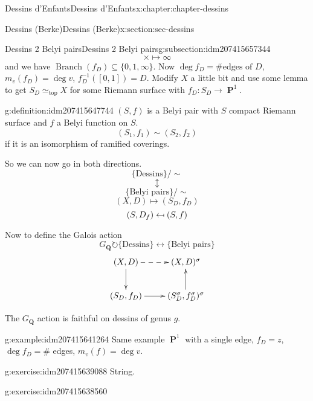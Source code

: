 \documentclass[oneside,10pt,]{book}
\numberwithin{equation}{section}
\newcommand{\lb}{[}
\newcommand{\rb}{]}
\providecommand\mapsfrom{\mathrel{\reflectbox{\ensuremath{\mapsto}}}}
\newcommand{\QQ}{\mathbf{Q}}
\newcommand{\acts}{\circlearrowright}
\DeclareMathOperator{\PP}{\mathbf{P}}
\begin{document}
\begin{chapterptx}{Dessins d'Enfants}{}{Dessins d'Enfants}{}{}{x:chapter:chapter-dessins}
\begin{sectionptx}{Dessins (Berke)}{}{Dessins (Berke)}{}{}{x:section:sec-dessins}
\begin{subsectionptx}{Dessins 2 Belyi pairs}{}{Dessins 2 Belyi pairs}{}{}{g:subsection:idm207415657344}
\begin{equation*}
\times \mapsto\infty
\end{equation*}
and we have \(\operatorname{Branch}(f_D) \subseteq \{0,1,\infty\}\). Now \(\deg f_D = \#\text{edges of }D\), \(m_v(f_D) = \deg v\), \(f_D^{-1}(\lb 0 , 1 \rb) = D\). Modify \(X\) a little bit and use some lemma to get \(S_D \simeq_{\text{top}} X\) for some Riemann surface with \(f_D\colon S_D \to \PP^1\).%
\begin{definition}{}{g:definition:idm207415647744}%
\((S,f)\) is a Belyi pair with \(S\) compact Riemann surface and  \(f\) a Belyi function on \(S\).%
\begin{equation*}
(S_1,f_1) \sim (S_2, f_2)
\end{equation*}
if it is an isomorphism of ramified coverings.%
\end{definition}
So we can now go in both directions.%
\begin{equation*}
\{\text{Dessins}\}/\sim
\end{equation*}
%
\begin{equation*}
\updownarrow
\end{equation*}
%
\begin{equation*}
\{\text{Belyi pairs}\}/\sim
\end{equation*}
%
\begin{equation*}
(X,D) \mapsto (S_D, f_D)
\end{equation*}
%
\begin{equation*}
(S, D_f) \mapsfrom (S,f)
\end{equation*}
%
\par
Now to define the Galois action%
\begin{equation*}
G_\QQ\acts \{\text{Dessins}\}\leftrightarrow \{\text{Belyi pairs}\}
\end{equation*}
%
\begin{equation*}
\xymatrix{
(X,D)\ar[d] \ar@{-->}[r] & (X,D)^\sigma \\
(S_D,f_D)\ar[r] & (S_D^\sigma,f_D^\sigma)^\sigma \ar[u]
}
\end{equation*}
%
\par
The \(G_\QQ\) action is faithful on dessins of genus \(g\).%
\begin{example}{}{g:example:idm207415641264}%
Same example \(\PP^1\) with a single edge, \(f_D  = z\), \(\deg f_D = \#\) edges, \(m_v(f)=  \deg v\).%
\end{example}
\begin{inlineexercise}{}{g:exercise:idm207415639088}%
String.%
\end{inlineexercise}
\begin{inlineexercise}{}{g:exercise:idm207415638560}%

\end{inlineexercise}
\end{subsectionptx}
\end{sectionptx}
\end{chapterptx}
\end{document}
